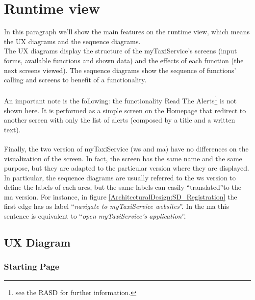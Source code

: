 \documentclass[\mainpath/main]{subfiles}
\begin{document}
\section{Runtime view}
\label{ArchitecturalDesign:runtime}

In this paragraph we'll show the main features on the runtime view, which means the UX diagrams and the sequence diagrams.\\
The UX diagrams display the structure of the myTaxiService's screens (input forms, available functions and shown data) and the effects of each function (the next screens viewed). The sequence diagrams show the sequence of functions' calling and screens to benefit of a functionality.\\
\\
An important note is the following: the functionality Read The Alerts\footnote{see the RASD for further information.} is not shown here. It is performed as a simple screen on the Homepage that redirect to another screen with only the list of alerts (composed by a title and a written text).\\
\\
Finally, the two version of myTaxiService (\gls{ws} and \gls{ma}) have no differences on the visualization of the screen. In fact, the screen has the same name and the same purpose, but they are adapted to the particular version where they are displayed.\\
In particular, the sequence diagrams are usually referred to the \gls{ws} version to define the labels of each arcs, but the same labels can easily \textquotedblleft translated\textquotedblright to the \gls{ma} version. For instance, in figure \ref{ArchitecturalDesign:SD_Registration} the first edge has as label \textquotedblleft \textit{navigate to myTaxiService websites}\textquotedblright . In the \gls{ma} this sentence is equivalent to \textquotedblleft \textit{open myTaxiService's application}\textquotedblright .


\subsection{UX Diagram}
\label{ArchitecturalDesign:UX}

\subsubsection{Starting Page}
\label{ArchitecturalDesign:UX_StartingPage}
\end{document}
